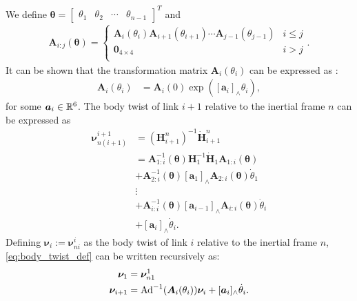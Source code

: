 \iffalse
We define $\bm{\theta} = \begin{bmatrix}\theta_1 & \theta_2 & \cdots & \theta_{n-1}\end{bmatrix}^T$
and
\begin{align}
    \bm{A}_{i:j}(\bm{\theta}) =
    \begin{cases}
        \bm{A}_i(\theta_i) \bm{A}_{i+1}(\theta_{i+1}) \cdots \bm{A}_{j-1}(\theta_{j-1}) & i \leq j \\
        \bm{0}_{4 \times 4} & i > j \\
    \end{cases}.
\end{align}
It can be shown that the transformation matrix $\bm{A}_{i}(\theta_i)$ can be
expressed as \cite{murray2017}:
\begin{align}
    \bm{A}_i(\theta_i) &= \bm{A}_i(0) \exp([\bm{a}_i]_{\wedge} \theta_i), \label{eq:expmap}
\end{align}
for some $\bm{a}_i \in \mathbb{R}^6$. The body twist
of link $i+1$ relative to the inertial frame $n$ can be expressed as
\begin{subequations}
\begin{align}
    \bm{\nu}_{n(i+1)}^{i+1} &= \left(\bm{H}_{i+1}^n\right)^{-1} \dot{\bm{H}}_{i+1}^n \\
    &= \bm{A}_{1:i}^{-1}(\bm\theta) \bm{H}_1^{-1} \dot{\bm{H}}_{1} \bm{A}_{1:i}(\bm\theta) \nonumber \\
    &+ \bm{A}_{2:i}^{-1}(\bm\theta) [\bm{a}_1]_{\wedge}\bm{A}_{2:i}(\bm\theta) \dot{\theta}_1 \nonumber \\
    &\vdots \label{eq:body_twist_def} \\
    &+ \bm{A}_{i:i}^{-1}(\bm\theta) [\bm{a}_{i-1}]_{\wedge}\bm{A}_{i:i}(\bm\theta) \dot{\theta}_{i} \nonumber \\
    &+ [\bm{a}_{i}]_{\wedge} \dot{\theta}_i. \nonumber
\end{align}
\end{subequations}
Defining $\bm{\nu}_i := \bm{\nu}_{ni}^i$ as the body twist of link $i$ relative to
the inertial frame $n$, \autoref{eq:body_twist_def} can be written recursively as:
\begin{subequations}
    \label{eq:body_twist_recursive}
\begin{align}
    \bm{\nu}_{1} &= \bm{\nu}_{n1}^1 \\
    \bm{\nu}_{i+1} &= \operatorname{Ad}^{-1}(\bm{A}_i(\theta_i)) \bm{\nu}_i + [\bm{a}_i]_{\wedge} \dot{\theta}_i.
\end{align}
\end{subequations}

